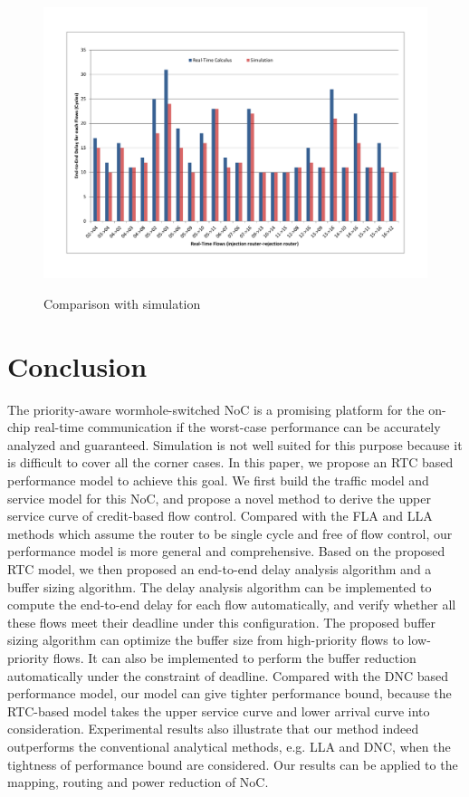 \documentclass[preprint]{elsarticle}
\begin{document}
\begin{figure}
  \centering
  \includegraphics[scale=0.45]{figures/ericsson.pdf}\\
  \caption{Comparison with simulation}\label{ericsson}
\end{figure}

\section{Conclusion}\label{conclusion}
The priority-aware wormhole-switched NoC is a promising platform for the on-chip real-time communication if the worst-case performance can be accurately analyzed and guaranteed. Simulation is not well suited for this purpose because it is difficult to cover all the corner cases. In this paper, we propose an RTC based performance model to achieve this goal. We first build the traffic model and service model for this NoC, and propose a novel method to derive the upper service curve of credit-based flow control. Compared with the FLA and LLA methods which assume the router to be single cycle and free of flow control, our performance model is more general and comprehensive. Based on the proposed RTC model, we then proposed an end-to-end delay analysis algorithm and a buffer sizing algorithm. The delay analysis algorithm can be implemented to compute the end-to-end delay for each flow automatically, and verify whether all these flows meet their deadline under this configuration. The proposed buffer sizing algorithm can optimize the buffer size from high-priority flows to low-priority flows. It can also be implemented to perform the buffer reduction automatically under the constraint of deadline. Compared with the DNC based performance model, our model can give tighter performance bound, because the RTC-based model takes the upper service curve and lower arrival curve into consideration. Experimental results also illustrate that our method indeed outperforms the conventional analytical methods, e.g. LLA and DNC, when the tightness of performance bound are considered. Our results can be applied to the mapping, routing and power reduction of NoC.
\end{document}
